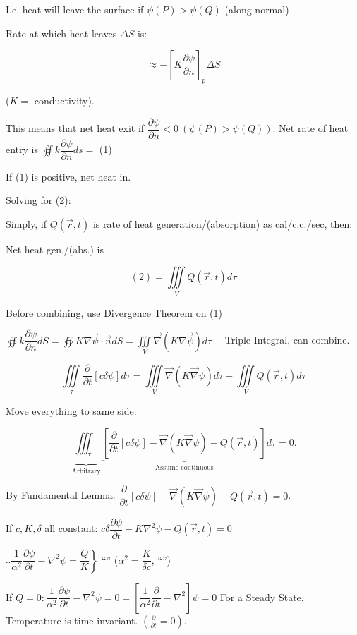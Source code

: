 \documentclass{report}
\begin{document}
I.e. heat will leave the surface if $\psi(P)>\psi(Q)$ (along normal)

Rate at which heat leaves $\Delta S$ is: 

$$
\approx-\left[K \dfrac{\partial \psi}{\partial n}\right]_{p} \Delta S
$$

($K=$ conductivity).

This means that net heat exit if $\dfrac{\partial \psi}{\partial n}<0\ (\psi(P)>\psi(Q))$. Net rate of heat entry is $\oiint k \dfrac{\partial \psi}{\partial n} d s=$ (1)

If (1) is positive, net heat in.

Solving for (2):

Simply, if $Q(\vec{r}, t)$ is rate of heat generation/(absorption) as cal/c.c./sec, then:

Net heat gen./(abs.) is

$$
(2)=\iiint\limits_{V} Q(\vec{r}, t) d \tau
$$

Before combining, use Divergence Theorem on (1)

$\oiint k \dfrac{\partial \psi}{\partial n} d S=\oiint  K \nabla \vec{\psi} \cdot \vec{n} d S=\iiint\limits_{V} \vec{\nabla}(K \nabla \vec{\psi}) d \tau \quad$ Triple Integral, can combine.


\begin{equation*}
\iiint\limits_{\tau} \dfrac{\partial}{\partial t}[c \delta \psi] d \tau=\iiint\limits_{V} \vec{\nabla}(K \vec{\nabla} \psi) d \tau+\iiint\limits_{V} Q(\vec{r}, t) d \tau
\end{equation*}


Move everything to same side:

$$
\underbrace{\iiint_{\tau}}_{\text {Arbitrary}} \underbrace{\left[\dfrac{\partial}{\partial t}[c \delta \psi]-\vec{\nabla}(K \vec{\nabla} \psi)-Q(\vec{r}, t)\right]}_{\text{Assume continuous}} d \tau=0.
$$

By Fundamental Lemma: $\dfrac{\partial}{\partial t}[c \delta \psi]-\vec{\nabla}(K \vec{\nabla} \psi)-Q(\vec{r}, t)=0$.

If $c, K, \delta$ all constant: $c \delta \dfrac{\partial \psi}{\partial t}-K \nabla^{2} \psi-Q(\vec{r}, t)=0$

$\left.\therefore \dfrac{1}{\alpha^{2}} \dfrac{\partial \psi}{\partial t}-\nabla^{2} \psi=\dfrac{Q}{K}\right\}$ ``'' ($\alpha^{2}=\dfrac{K}{\delta c}$, ``'')

If $Q=0: \dfrac{1}{\alpha^{2}} \dfrac{\partial \psi}{\partial t}-\nabla^{2} \psi=0=\left[\dfrac{1}{\alpha^{2}} \dfrac{\partial}{\partial t}-\nabla^{2}\right] \psi=0$ For a Steady State, Temperature is time  invariant. $\left(\frac{\partial}{\partial t}=0\right)$.
\end{document}
